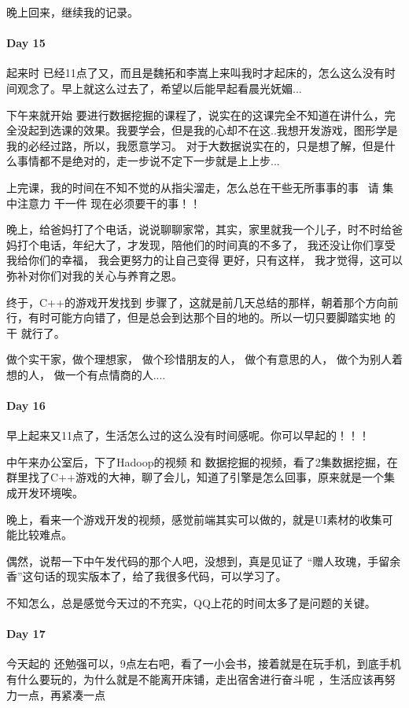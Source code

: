 \documentclass[UTF8,a4paper,8pt]{ctexart}
\begin{document}
 		  晚上回来，继续我的记录。
 		  
 		  \paragraph{Day 15}
 		  起来时  已经11点了又，而且是魏拓和李嵩上来叫我时才起床的，怎么这么没有时间观念了。早上就这么过去了，希望以后能早起看晨光妩媚...
 		  
 		  下午来就开始 要进行数据挖掘的课程了，说实在的这课完全不知道在讲什么，完全没起到选课的效果。我要学会，但是我的心却不在这..我想开发游戏，图形学是我的必经过路，所以，我愿意学习。
 		  对于大数据说实在的，只是想了解，但是什么事情都不是绝对的，走一步说不定下一步就是上上步...
 		  
 		  上完课，我的时间在不知不觉的从指尖溜走，怎么总在干些无所事事的事~  请 集中注意力  干一件 现在必须要干的事！！
 		  
 		  晚上，给爸妈打了个电话，说说聊聊家常，其实，家里就我一个儿子，时不时给爸妈打个电话，年纪大了，才发现，陪他们的时间真的不多了， 我还没让你们享受我给你们的幸福， 我会更努力的让自己变得 更好，只有这样， 我才觉得，这可以弥补对你们对我的关心与养育之恩。 
 		  
 		  终于，C++的游戏开发找到 步骤了，这就是前几天总结的那样，朝着那个方向前行，有时可能方向错了，但是总会到达那个目的地的。所以一切只要脚踏实地 的 干 就行了。  
 		  
 		  做个实干家，做个理想家， 做个珍惜朋友的人， 做个有意思的人， 做个为别人着想的人， 做一个有点情商的人....
 		  
 		  \paragraph{Day 16}
 		  早上起来又11点了，生活怎么过的这么没有时间感呢。你可以早起的！！！
 		  
 		  中午来办公室后，下了Hadoop的视频 和 数据挖掘的视频，看了2集数据挖掘，在群里找了C++游戏的大神，聊了会儿，知道了引擎是怎么回事，原来就是一个集成开发环境唉。  
 		  
 		  晚上，看来一个游戏开发的视频，感觉前端其实可以做的，就是UI素材的收集可能比较难点。
 		  
 		  偶然，说帮一下中午发代码的那个人吧，没想到，真是见证了 “赠人玫瑰，手留余香”这句话的现实版本了，给了我很多代码，可以学习了。
 		  
 		  不知怎么，总是感觉今天过的不充实，QQ上花的时间太多了是问题的关键。
 		  \paragraph{Day 17}
 		  今天起的  还勉强可以，9点左右吧，看了一小会书，接着就是在玩手机，到底手机有什么要玩的，为什么就是不能离开床铺，走出宿舍进行奋斗呢
 		  ，生活应该再努力一点，再紧凑一点
 		  
\end{document}
